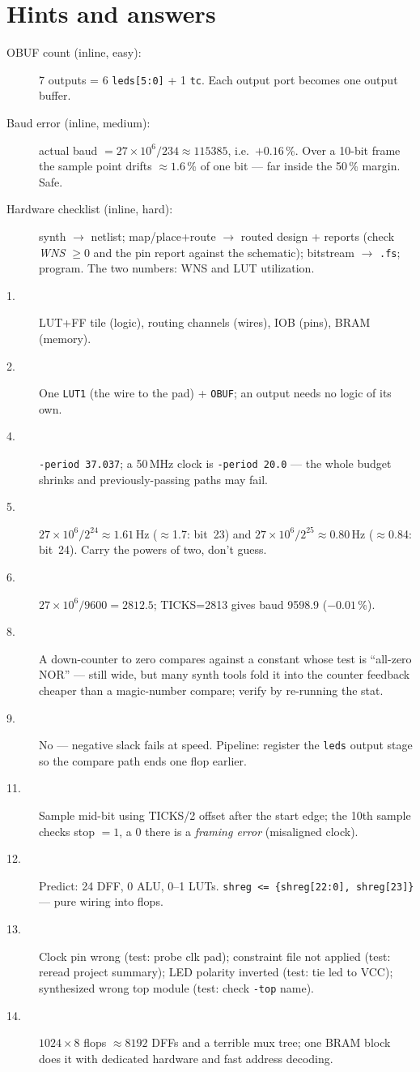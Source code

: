 \section*{Hints and answers}

\begin{description}
\item[OBUF count (inline, easy):] 7 outputs = 6 \texttt{leds[5:0]} + 1
\texttt{tc}. Each output port becomes one output buffer.
\item[Baud error (inline, medium):] actual baud $= 27\times10^6/234 \approx
115385$, i.e.\ $+0.16$\,\%. Over a 10-bit frame the sample point drifts
$\approx 1.6$\,\% of one bit --- far inside the 50\,\% margin. Safe.
\item[Hardware checklist (inline, hard):] synth $\to$ netlist; map/place+route
$\to$ routed design + reports (check \emph{WNS $\geq 0$} and the pin report
against the schematic); bitstream $\to$ \texttt{.fs}; program. The two numbers:
WNS and LUT utilization.
\item[1.] LUT+FF tile (logic), routing channels (wires), IOB (pins), BRAM
(memory).
\item[2.] One \texttt{LUT1} (the wire to the pad) + \texttt{OBUF}; an output
needs no logic of its own.
\item[4.] \texttt{-period 37.037}; a 50\,MHz clock is \texttt{-period 20.0} ---
the whole budget shrinks and previously-passing paths may fail.
\item[5.] $27\times10^6/2^{24} \approx 1.61$\,Hz ($\approx$1.7: bit~23) and
$27\times10^6/2^{25} \approx 0.80$\,Hz ($\approx$0.84: bit~24). Carry the
powers of two, don't guess.
\item[6.] $27\times10^6/9600 = 2812.5$; TICKS=2813 gives baud 9598.9 ($-0.01$\,\%).
\item[8.] A down-counter to zero compares against a constant whose test is
``all-zero NOR'' --- still wide, but many synth tools fold it into the counter
feedback cheaper than a magic-number compare; verify by re-running the stat.
\item[9.] No --- negative slack fails at speed. Pipeline: register the
\texttt{leds} output stage so the compare path ends one flop earlier.
\item[11.] Sample mid-bit using TICKS/2 offset after the start edge; the 10th
sample checks stop $=1$, a 0 there is a \emph{framing error} (misaligned
clock).
\item[12.] Predict: 24 DFF, 0 ALU, 0--1 LUTs. \texttt{shreg <= \{shreg[22:0], shreg[23]\}} --- pure wiring into flops.
\item[13.] Clock pin wrong (test: probe clk pad); constraint file not applied
(test: reread project summary); LED polarity inverted (test: tie led to VCC);
synthesized wrong top module (test: check \texttt{-top} name).
\item[14.] $1024\times8$ flops $\approx 8192$ DFFs and a terrible mux tree;
one BRAM block does it with dedicated hardware and fast address decoding.
\end{description}

